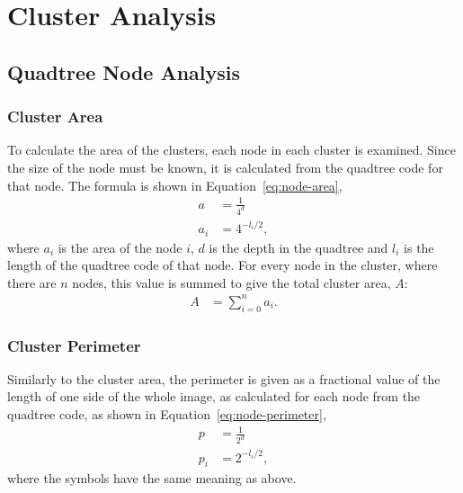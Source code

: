 
\section{Cluster Analysis}
\label{sec:cluster_analysis}


\subsection{Quadtree Node Analysis}
\label{sub:quadtree_node_analysis}


\subsubsection{Cluster Area}
\label{ssub:Cluster Area}

To calculate the area of the clusters, each node in each cluster is examined.
Since the size of the node must be known, it is calculated from the quadtree
code for that node. The formula is shown in Equation~\ref{eq:node-area},
\begin{align}
	a &= \frac{1}{4^{d}} \\
	a_i &= 4^{-l_i/2}, \label{eq:node-area}
\end{align}
where $a_i$ is the area of the node $i$, $d$ is the depth in the quadtree and
$l_i$ is the length of the quadtree code of that node. For every node in the
cluster, where there are $n$ nodes, this value is summed to give the total
cluster area, $A$:
\begin{align}
	A &= \sum_{i=0}^{n} a_i.
\end{align}

\subsubsection{Cluster Perimeter}
\label{ssub:Cluster Perimeter}

Similarly to the cluster area, the perimeter is given as a fractional value of
the length of one side of the whole image, as calculated for each node from the
quadtree code, as shown in Equation~\ref{eq:node-perimeter},
\begin{align}
	p &= \frac{1}{2^{d}} \\
	p_i &= 2^{-l_i/2}, \label{eq:node-perimeter}
\end{align}
where the symbols have the same meaning as above.

